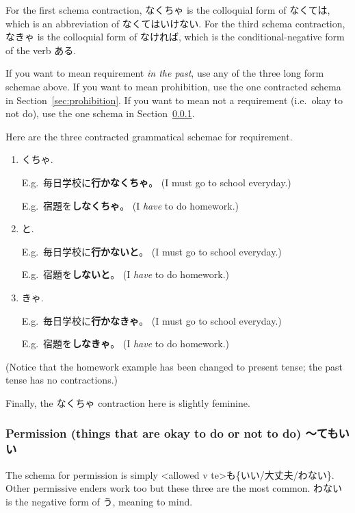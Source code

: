 \documentclass[../nihongo-gakushuu-kyouzai.tex]{subfiles}
\begin{document}
For the first schema contraction, なくちゃ is the colloquial form of なくては, which is an abbreviation of なくてはいけない. For the third schema contraction, なきゃ is the colloquial form of なければ, which is the conditional-negative form of the verb ある. 

 If you want to mean requirement \emph{in the past}, use any of the three long form schemae above. If you want to mean prohibition, use the one contracted schema in Section~\ref{sec:prohibition}. If you want to mean not a requirement (i.e.\ okay to not do), use the one schema in Section~\ref{sec:permission}.

Here are the three contracted grammatical schemae for requirement.
\begin{enumerate}[label=\arabic*.]
    \item <v negative fragment ending in な>くちゃ.

    E.g.\ 毎日学校に\textbf{行かなくちゃ}。 (I must go to school everyday.)

    E.g.\ 宿題を\textbf{しなくちゃ}。 (I \emph{have} to do homework.)
    \item <v negative>と.

    E.g.\ 毎日学校に\textbf{行かないと}。 (I must go to school everyday.)

    E.g.\ 宿題を\textbf{しないと}。 (I \emph{have} to do homework.)

    \item <v negative fragment ending in な>きゃ.

    E.g.\ 毎日学校に\textbf{行かなきゃ}。 (I must go to school everyday.)

    E.g.\ 宿題を\textbf{しなきゃ}。 (I \emph{have} to do homework.)
\end{enumerate}
(Notice that the homework example has been changed to present tense; the past tense has no contractions.)

Finally, the なくちゃ contraction here is slightly feminine.

\subsubsection{Permission (things that are okay to do or not to do) 〜てもいい} \label{sec:permission}
The schema for permission is simply <allowed v te>も\{いい/大丈夫/わない\}. Other permissive enders work too but these three are the most common. わない is the negative form of う, meaning to mind.
\end{document}
